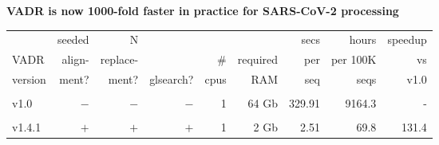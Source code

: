 \documentclass[landscape]{slides}
\begin{document}
\begin{slide}
\begin{center}
\normalsize{\textbf{VADR is now 1000-fold faster in practice for SARS-CoV-2 processing}}

\scriptsize
\begin{tabular}{lrrrrrrrr}
            &seeded      &N           &            &            &            &secs        &hours       &speedup     \\ 
VADR        &align-      &replace-    &            &\#          &required    &per         &per 100K    &vs          \\ 
version     &ment?       &ment?       &glsearch?   &cpus        &RAM         &seq         &seqs        &v1.0        \\ 
\hline
& & & & & & & & \\
v1.0         &$-$         &$-$         &$-$         &1           &64 Gb       &329.91      &9164.3      &-           \\
& & & & & & & & \\
v1.4.1       &$+$         &$+$         &$+$         &1           &2 Gb        &2.51        &69.8        &131.4       \\
\end{tabular}
\end{center}

\vfill
\end{slide}
\end{document}
